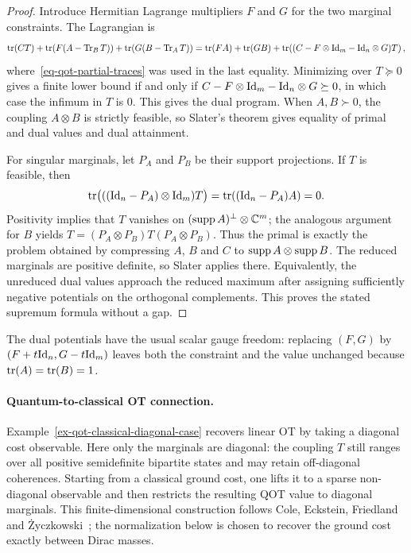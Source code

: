 \begin{proof}
	Introduce Hermitian Lagrange multipliers $F$ and $G$ for the two marginal constraints. The Lagrangian is
	\[
		\operatorname{tr}(CT)+\operatorname{tr}\!\left(F(A-\operatorname{Tr}_B T)\right)
		+\operatorname{tr}\!\left(G(B-\operatorname{Tr}_A T)\right)
		=
		\operatorname{tr}(FA)+\operatorname{tr}(GB)
		+\operatorname{tr}\!\left((C-F\otimes\mathrm{Id}_m-\mathrm{Id}_n\otimes G)T\right),
	\]
	where~\eqref{eq-qot-partial-traces} was used in the last equality. Minimizing over $T\succeq0$ gives a finite lower bound if and only if $C-F\otimes\mathrm{Id}_m-\mathrm{Id}_n\otimes G\succeq0$, in which case the infimum in $T$ is $0$. This gives the dual program. When $A,B\succ0$, the coupling $A\otimes B$ is strictly feasible, so Slater's theorem gives equality of primal and dual values and dual attainment.

	For singular marginals, let $P_A$ and $P_B$ be their support projections. If $T$ is feasible, then
	\[
		\operatorname{tr}\bigl(((\mathrm{Id}_n-P_A)\otimes\mathrm{Id}_m)T\bigr)
		=
		\operatorname{tr}((\mathrm{Id}_n-P_A)A)=0.
	\]
	Positivity implies that $T$ vanishes on $(\operatorname{supp} A)^\perp\otimes\mathbb{C}^m$; the analogous argument for $B$ yields
	\(T=(P_A\otimes P_B)T(P_A\otimes P_B)\).
	Thus the primal is exactly the problem obtained by compressing $A$, $B$ and $C$ to $\operatorname{supp} A\otimes\operatorname{supp} B$. The reduced marginals are positive definite, so Slater applies there. Equivalently, the unreduced dual values approach the reduced maximum after assigning sufficiently negative potentials on the orthogonal complements. This proves the stated supremum formula without a gap.
\end{proof}

The dual potentials have the usual scalar gauge freedom: replacing $(F,G)$ by $(F+t\mathrm{Id}_n,G-t\mathrm{Id}_m)$ leaves both the constraint and the value unchanged because $\operatorname{tr}(A)=\operatorname{tr}(B)=1$.

\paragraph{Quantum-to-classical OT connection.}
Example~\ref{ex-qot-classical-diagonal-case} recovers linear OT by taking a diagonal cost observable. Here only the marginals are diagonal: the coupling $T$ still ranges over all positive semidefinite bipartite states and may retain off-diagonal coherences. Starting from a classical ground cost, one lifts it to a sparse non-diagonal observable and then restricts the resulting QOT value to diagonal marginals. This finite-dimensional construction follows Cole, Eckstein, Friedland and {\.Z}yczkowski~\cite{ColeEcksteinFriedlandZyczkowski2023}; the normalization below is chosen to recover the ground cost exactly between Dirac masses.

